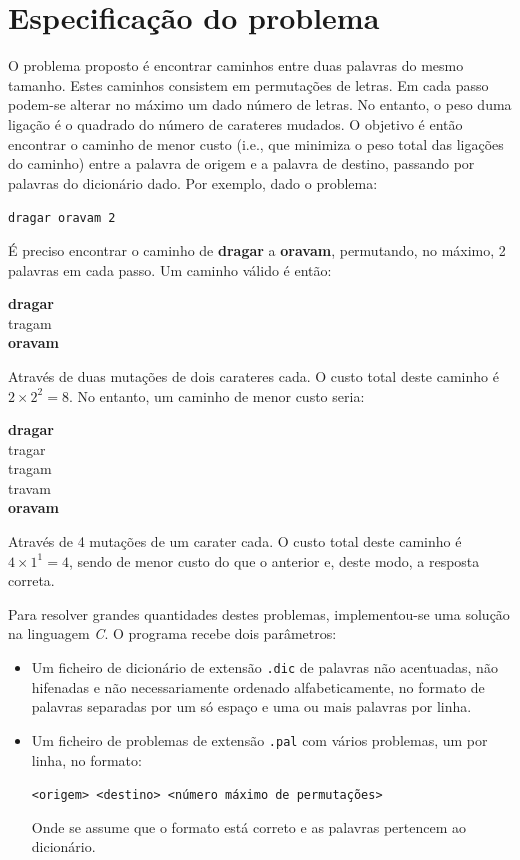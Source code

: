 \documentclass[a4paper, 18pt]{article}
\begin{document}


\tableofcontents
\newpage

\section{Especificação do problema}
	\par
	O problema proposto é encontrar caminhos entre duas palavras do mesmo tamanho. Estes caminhos consistem em permutações de letras. Em cada passo podem-se alterar no máximo um dado número de letras. No entanto, o peso duma ligação é o quadrado do número de carateres mudados. O objetivo é então encontrar o caminho de menor custo (i.e., que minimiza o peso total das ligações do caminho) entre a palavra de origem e a palavra de destino, passando por palavras do dicionário dado. Por exemplo, dado o problema:
	\begin{center}
		\texttt{dragar oravam 2}
	\end{center}
	\par
	É preciso encontrar o caminho de \textbf{dragar} a \textbf{oravam}, permutando, no máximo, 2 palavras em cada passo. Um caminho válido é então:
	\begin{center}
		\textbf{dragar} \\
		tragam \\
		\textbf{oravam}
	\end{center}
	\par
	Através de duas mutações de dois carateres cada. O custo total deste caminho é $2 \times 2^2 = 8$. No entanto, um caminho de menor custo seria:
	\begin{center}
		\textbf{dragar} \\
		tragar \\
		tragam \\
		travam \\
		\textbf{oravam}
	\end{center}
	\par
	Através de 4 mutações de um carater cada. O custo total deste caminho é $4 \times 1^1 = 4$, sendo de menor custo do que o anterior e, deste modo, a resposta correta.
	\par
	Para resolver grandes quantidades destes problemas, implementou-se uma solução na linguagem \textit{C}.
	O programa recebe dois parâmetros: \\
	\begin{itemize}
		\item Um ficheiro de dicionário de extensão \texttt{.dic} de palavras não acentuadas, não hifenadas e não necessariamente ordenado alfabeticamente, no formato de palavras separadas por um só espaço e uma ou mais palavras por linha.
		\item Um ficheiro de problemas de extensão \texttt{.pal} com vários problemas, um por linha, no formato:
		\begin{center}
		\texttt{<origem> <destino> <número máximo de permutações>}
		\end{center}
		\par
		Onde se assume que o formato está correto e as palavras pertencem ao dicionário.
	\end{itemize}
\end{document}

